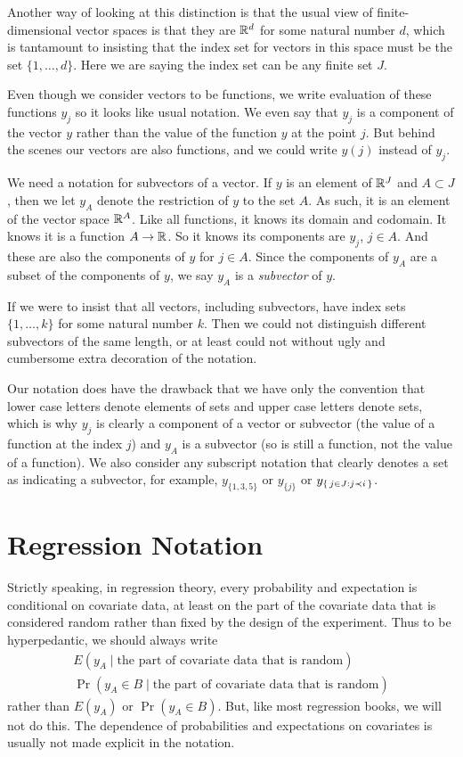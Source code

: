 Another way of looking at this distinction is that the usual view of
finite-dimensional vector spaces is that they are $\mathbb{R}^d$ for some
natural number $d$, which is tantamount to insisting that the index
set for vectors in this space must be the set $\{1, \ldots, d\}$.
Here we are saying the index set can be any finite set $J$.

Even though we consider vectors to be functions, we write evaluation
of these functions $y_j$ so it looks like usual notation.  We even say
that $y_j$ is a component of the vector $y$ rather than the value of
the function $y$ at the point $j$.  But behind the scenes our vectors
are also functions, and we could write $y(j)$ instead of $y_j$.

We need a notation for subvectors of a vector.  If $y$ is an element
of $\mathbb{R}^J$ and $A \subset J$, then we let $y_A$ denote the restriction
of $y$ to the set $A$.
As such, it is an element of the vector space $\mathbb{R}^A$.
Like all functions, it knows its domain and codomain.
It knows it is a function $A \to \mathbb{R}$.
So it knows its components are $y_j$, $j \in A$.
And these are also the components of $y$ for $j \in A$.
Since the components of $y_A$ are a subset of the components of $y$,
we say $y_A$ is a \emph{subvector} of $y$.

If we were to insist that all vectors, including subvectors, have
index sets $\{1, \ldots, k\}$ for some natural number $k$.  Then we could
not distinguish different subvectors of the same length, or at least could
not without ugly and cumbersome extra decoration of the notation.

Our notation does have the drawback that we have only the convention
that lower case letters denote elements of sets and upper case letters
denote sets, which is why $y_j$ is clearly a component of a vector or subvector
(the value of a function at the index $j$) and $y_A$ is a subvector
(so is still a function, not the value of a function).
We also consider any subscript notation that clearly denotes a set
as indicating a subvector, for example, $y_{\{1, 3, 5\}}$ or $y_{\{j\}}$ or
$y_{\{\,  j \in J : j \prec i  \,\}}$.

\section{Regression Notation}

Strictly speaking, in regression theory, every probability and expectation
is conditional on covariate data, at least on the part of the covariate data
that is considered random rather than fixed by the design of the experiment.
Thus to be hyperpedantic, we should always write
\begin{gather*}
   E(y_A \mid \text{the part of covariate data that is random})
   \\
   \Pr(y_A \in B \mid \text{the part of covariate data that is random})
\end{gather*}
rather than $E(y_A)$ or $\Pr(y_A \in B)$.  But, like most regression books,
we will not do this.  The dependence of probabilities and expectations on
covariates is usually not made explicit in the notation.

